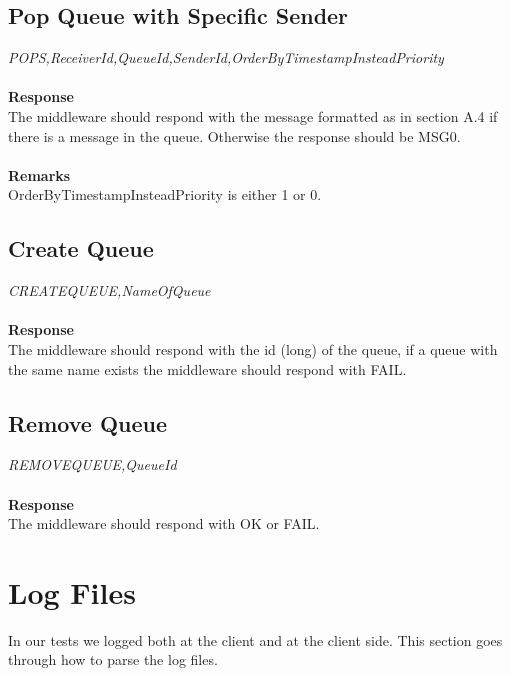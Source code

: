 \documentclass{article}
\begin{document}
            \subsection{Pop Queue with Specific Sender}
                \indent\indent\textit{POPS,ReceiverId,QueueId,SenderId,OrderByTimestampInsteadPriority}\\
                \\
                \textbf{Response}\\
                The middleware should respond with the message formatted as in section A.4 if there is a message in the queue. Otherwise the response should be MSG0.\\
                \\
                \textbf{Remarks}\\
                OrderByTimestampInsteadPriority is either 1 or 0.

            \subsection{Create Queue}
                \indent\indent\textit{CREATEQUEUE,NameOfQueue}\\
                \\
                \textbf{Response}\\
                The middleware should respond with the id (long) of the queue, if a queue with the same name exists the middleware should respond with FAIL.

            \subsection{Remove Queue}
                \indent\indent\textit{REMOVEQUEUE,QueueId}\\
                \\
                \textbf{Response}\\
                The middleware should respond with OK or FAIL.

        \section{Log Files}
        In our tests we logged both at the client and at the client side. This section goes through how to parse the log files.
\end{document}
